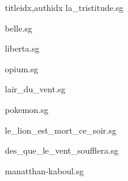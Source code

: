 \documentclass[
    ]{article}
\begin{document}
\begin{songs}{titleidx,authidx}
{la_tristitude.sg}


{belle.sg}


{liberta.sg}


{opium.sg}


{lair_du_vent.sg}


{pokemon.sg}


{le_lion_est_mort_ce_soir.sg}


{des_que_le_vent_soufflera.sg}


{manatthan-kaboul.sg}



\end{songs}
\end{document}
